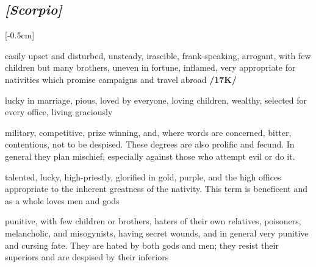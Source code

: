 \subsection{\textit{[Scorpio]}}
\marginnote{\Scorpio}[-0.5cm]
\vspace{-1mm}
\begin{description}[labelindent=0em , labelwidth=1em, labelsep=1em, leftmargin =!]
\item[\Mars]
	[0-6] easily upset and disturbed, unsteady, irascible, frank-speaking, arrogant, with few children but many brothers, uneven in fortune, inflamed, very appropriate for nativities which promise campaigns and travel abroad \textbf{/17K/}
\item[\Venus]
	[7-10] lucky in marriage, pious, loved by everyone, loving children, wealthy, selected for every office, living graciously
\item[\Mercury]
	[11-18] military, competitive, prize winning, and, where words are concerned, bitter, contentious, not to be despised. These degrees are also prolific and fecund. In general they plan mischief, especially against those who attempt evil or do it.
\item[\Jupiter]
	[19-23] talented, lucky, high-priestly, glorified in gold, purple, and the high offices appropriate to the inherent greatness of the nativity. This term is beneficent and as a whole loves men and gods
\item[\Saturn]
	[24-29] punitive, with few children or brothers, haters of their own relatives, poisoners, melancholic, and misogynists, having secret wounds, and in general very punitive and cursing fate. They are hated by both gods and men; they resist their superiors and are despised by their inferiors
\end{description}

